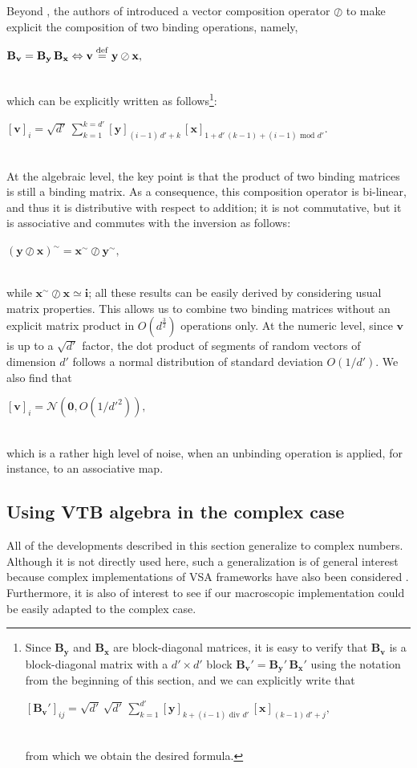 \documentclass[sn-mathphys]{sn-jnl}
\newcommand{\defq}{\stackrel {\rm def}{=}}
\newcommand{\eqline}[1]{~\vspace{0.1cm}\\\centerline{$#1$}\vspace{0.1cm}\\}
\begin{document}
\begin{appendices}
Beyond \cite{gosmann_vector-derived_2019}, the authors of \cite{mercier_ontology_2021} introduced a vector composition operator $\oslash$ to make explicit the composition of two binding operations, namely,
\eqline{\mathbf{B_v} = \mathbf{B_y} \, \mathbf{B_x} \Leftrightarrow \mathbf{v} \defq \mathbf{y} \oslash \mathbf{x},}
which can be explicitly written as follows\footnote{Since $\mathbf{B_y}$ and $\mathbf{B_x}$ are block-diagonal matrices, it is easy to verify that $\mathbf{B_v}$ is a block-diagonal matrix with a $d' \times d'$ block $\mathbf{B_v}' = \mathbf{B_y}' \, \mathbf{B_x}'$ using the notation from the beginning of this section, and we can explicitly write that
\eqline{[\mathbf{B_v}']_{ij} = \sqrt{d'} \, \sqrt{d'} \, \sum_{k = 1}^{d'} [\mathbf{y}]_{k + (i - 1) \mbox{ div } d'} \, [\mathbf{x}]_{(k - 1) \, d' + j},}
from which we obtain the desired formula.}:
\eqline{[\mathbf{v}]_i = \sqrt{d'} \, \sum_{k = 1}^{k = d'} [\mathbf{y}]_{(i - 1) \, d' + k} \, [\mathbf{x}]_{1 + d' \, (k - 1) + (i - 1) \mbox{ mod } d'}.} At the algebraic level, the key point is that the product of two binding matrices is still a binding matrix. As a consequence, this composition operator is bi-linear, and thus it is distributive with respect to addition; it is not commutative, but it is associative and commutes with the inversion as follows:
\eqline{(\mathbf{y} \oslash \mathbf{x})^\sim = \mathbf{x}^\sim \oslash \mathbf{y}^\sim,}
while $\mathbf{x}^\sim \oslash \mathbf{x} \simeq \mathbf{\mathbf{i}}$; all these results can be easily derived by considering usual matrix properties. This allows us to combine two binding matrices without an explicit matrix product in $O\left(d^{\frac{3}{2}}\right)$ operations only. At the numeric level, since $\mathbf{v}$ is up to a $\sqrt{d'}$ factor, the dot product of segments of random vectors of dimension $d'$ follows a normal distribution of standard deviation $O(1/d')$. We also find that
\eqline{[\mathbf{v}]_i = {\mathcal N}(\mathbf{0}, O(1/d'^2)),}
which is a rather high level of noise, when an unbinding operation is applied, for instance, to an associative map.

\subsection*{Using VTB algebra in the complex case}

All of the developments described in this section generalize to complex numbers. Although it is not directly used here, such a generalization is of general interest because complex implementations of VSA frameworks have also been considered \cite{schlegel_comparison_2020}. Furthermore, it is also of interest to see if our macroscopic implementation could be easily adapted to the complex case.


\end{appendices}
\end{document}
